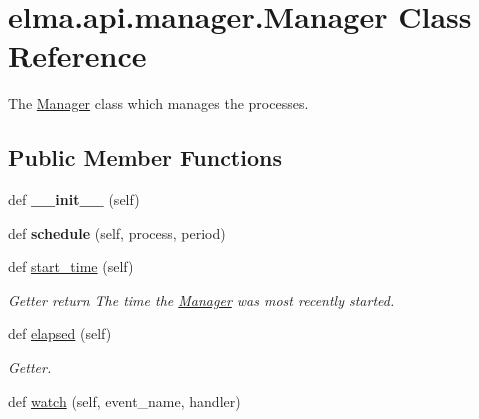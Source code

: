 \hypertarget{classelma_1_1api_1_1manager_1_1Manager}{}\section{elma.\+api.\+manager.\+Manager Class Reference}
\label{classelma_1_1api_1_1manager_1_1Manager}


The \hyperlink{classelma_1_1api_1_1manager_1_1Manager}{Manager} class which manages the processes.  


\subsection*{Public Member Functions}
\begin{DoxyCompactItemize}
\item 
\mbox{\label{classelma_1_1api_1_1manager_1_1Manager_af6ea4ce84e82ccc172774bb1ded3d3b0}} 
def {\bfseries \+\_\+\+\_\+init\+\_\+\+\_\+} (self)
\item 
\mbox{\label{classelma_1_1api_1_1manager_1_1Manager_afa7d8aad0d3fb8bc2da697ee251d8f66}} 
def {\bfseries schedule} (self, process, period)
\item 
\mbox{\label{classelma_1_1api_1_1manager_1_1Manager_adfd5bd95cca1ebfba742319c1d01e4e2}} 
def \hyperlink{classelma_1_1api_1_1manager_1_1Manager_adfd5bd95cca1ebfba742319c1d01e4e2}{start\+\_\+time} (self)
\begin{DoxyCompactList}\small\item\em Getter return The time the \hyperlink{classelma_1_1api_1_1manager_1_1Manager}{Manager} was most recently started. \end{DoxyCompactList}\item 
def \hyperlink{classelma_1_1api_1_1manager_1_1Manager_ad26dad0553c0e6936acbedba79b38bda}{elapsed} (self)
\begin{DoxyCompactList}\small\item\em Getter. \end{DoxyCompactList}\item 
\mbox{\label{classelma_1_1api_1_1manager_1_1Manager_a79300fdc4b141009a2c34648b566f216}} 
def \hyperlink{classelma_1_1api_1_1manager_1_1Manager_a79300fdc4b141009a2c34648b566f216}{watch} (self, event\+\_\+name, handler)

\end{DoxyCompactItemize}
